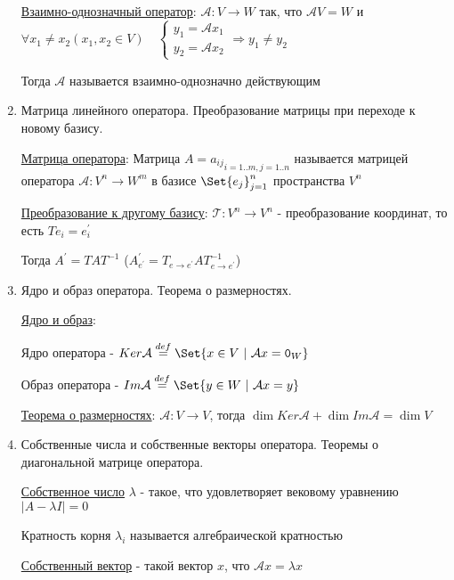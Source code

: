 \documentclass[12pt]{article}
\begin{document}
\begin{enumerate}
        \hyperlink{onetoonelinearoperator}{Взаимно-однозначный оператор}: $\mathcal{A} : V \rightarrow W$ так, что $\mathcal{A}V = W$ и $\forall x_1 \neq x_2 (x_1, x_2 \in V) \quad
        \begin{cases}y_1 = \mathcal{A}x_1 \\ y_2 = \mathcal{A}x_2\end{cases} \Longrightarrow y_1 \neq y_2$

        Тогда $\mathcal{A}$ называется взаимно-однозначно действующим

        \item Матрица линейного оператора. Преобразование матрицы при переходе к новому базису.

        \hyperlink{operatorsmatrix}{Матрица оператора}: Матрица $A = {a_{ij}}_{i=1..m, j=1..n}$ называется матрицей оператора $\mathcal{A} : V^n \rightarrow W^m$ в базисе $\Set{e_j}^n_{j=1}$ пространства $V^n$

        \hyperlink{transformationtodifferentbasis}{Преобразование к другому базису}:     $\mathcal{T} : V^n \rightarrow V^n$ - преобразование координат, то есть $Te_i = e^\prime_i$

        Тогда $A^\prime = TAT^{-1}$ ($A^\prime_{e^\prime} = T_{e\to e^\prime}AT^{-1}_{e\to e^\prime}$)

        \item Ядро и образ оператора. Теорема о размерностях.

        \hyperlink{kernalandimageofoperator}{Ядро и образ}:

        Ядро оператора - $Ker \mathcal{A} \stackrel{def}{=} \Set{x \in V \ | \ \mathcal{A}x = \texttt{0}_W}$

        Образ оператора - $Im \mathcal{A} \stackrel{def}{=} \Set{y \in W \ | \ \mathcal{A}x = y}$

        \hyperlink{theoremaboutdimensions}{Теорема о размерностях}: $\mathcal{A} : V \rightarrow V$, тогда $\dim Ker \mathcal{A} + \dim Im \mathcal{A} = \dim V$


        \item Собственные числа и собственные векторы оператора. Теоремы о диагональной матрице оператора.

        \hyperlink{eigenvalue}{Собственное число} $\lambda$ - такое, что удовлетворяет вековому уравнению $|A - \lambda I| = 0$

        Кратность корня $\lambda_i$ называется алгебраической кратностью

        \hyperlink{eigenvector}{Собственный вектор} - такой вектор $x$, что $\mathcal{A}x = \lambda x$


\end{enumerate}
\end{document}
